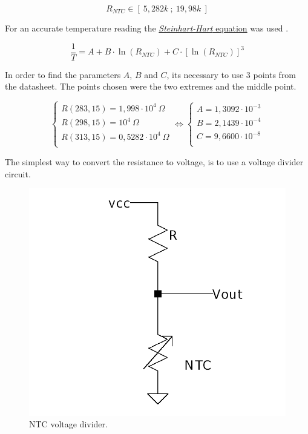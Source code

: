 \documentclass[12pt]{article}
\begin{document}
    $$R_{NTC} \in [~5,282k~;~19,98k~]$$

    For an accurate temperature reading the 
    \hyperref[eq:1]{ \textit{Steinhart-Hart} equation} was used .

    \begin{equation} \label{eq:1}
    \frac{1}{T} = A + B\cdot \ln(R_{NTC}) + C\cdot [\ln(R_{NTC})]^3
    \end{equation}

    In order to find the parameters $A$, $B$ and $C$, its necessary to use 3 points from the datasheet. 
    The points chosen were the two extremes and the middle point.
    
    \begin{equation}
        \begin{cases}
        
            R( 283,15 ) = 1,998\cdot 10^4 ~\Omega \\
            R( 298,15 ) = 10^4 ~\Omega\\
            R( 313,15 ) = 0,5282 \cdot 10^4 ~\Omega\\
        
        \end{cases}
        \Leftrightarrow
        \begin{cases}
            A = 1,3092 \cdot 10^{-3}\\
            B = 2,1439 \cdot 10^{-4}\\
            C = 9,6600 \cdot 10^{-8}\\
        
        \end{cases}
    \end{equation}

    The simplest way to convert the resistance to voltage, is to use a voltage divider circuit.

   \begin{figure}[H] 
        \centering
        \includegraphics*[scale = 0.25]{images/voltagedivider.png}
        \caption{NTC voltage divider.}
        \label{wrap-fig:1}
    \end{figure}
\end{document}
